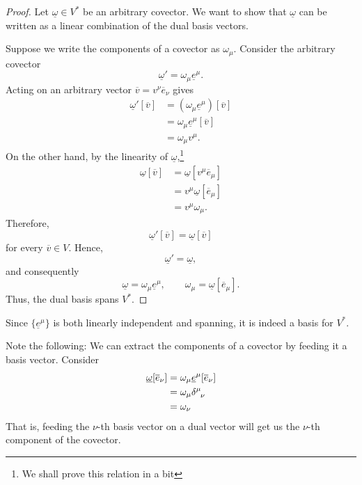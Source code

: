 		\begin{proof}
			Let $\underline{\omega}\in V^*$ be an arbitrary covector. We want to
			show that $\underline{\omega}$ can be written as a linear combination of
			the dual basis vectors.

			Suppose we write the components of a covector as $\omega_\mu$. Consider the arbitrary 
			covector
			\[
				\underline{\omega}'
				=
				\omega_\mu\underline{e}^\mu.
			\]
			Acting on an arbitrary vector $\overline{v}=v^\nu\overline{e}_\nu$ gives
			\begin{align}
				\underline{\omega}'[\overline{v}]
				&=
				\left(
					\omega_\mu\underline{e}^\mu
				\right)
				[\overline{v}]
				\nonumber\\
				&=
				\omega_\mu
				\underline{e}^\mu[\overline{v}]
				\nonumber\\
				&=
				\omega_\mu v^\mu.
			\end{align}
			On the other hand, by the linearity of $\underline{\omega}$,\footnote{We shall prove this relation in a bit}
			\begin{align}
				\underline{\omega}[\overline{v}]
				&=
				\underline{\omega}
				\left[
					v^\mu\overline{e}_\mu
				\right]
				\nonumber\\
				&=
				v^\mu
				\underline{\omega}[\overline{e}_\mu]
				\nonumber\\
				&=
				v^\mu\omega_\mu.
			\end{align}
			Therefore,
			\[
				\underline{\omega}'[\overline{v}]
				=
				\underline{\omega}[\overline{v}]
			\]
			for every $\overline{v}\in V$. Hence,
			\[
				\underline{\omega}'
				=
				\underline{\omega},
			\]
			and consequently
			\begin{equation}
				\label{eq:covector-expansion}
				\underline{\omega}
				=
				\omega_\mu\underline{e}^\mu,
				\qquad
				\omega_\mu
				=
				\underline{\omega}[\overline{e}_\mu].
			\end{equation}
			Thus, the dual basis spans $V^*$.
		\end{proof}

		Since $\{\underline{e}^\mu\}$ is both linearly independent and spanning,
		it is indeed a basis for $V^*$. 

		Note the following: We can extract the components of a covector by feeding it 
		a basis vector. Consider
		\begin{align*}
			\underline{\omega}
			[\overline{e}_\nu]
			&=
			\omega_\mu \underline{e}^\mu
			[\overline{e}_\nu] \\
			&= \omega_\mu \tensor{\delta}{^\mu_\nu}\\
			&= \omega_\nu
		\end{align*}
		That is, feeding the $\nu$-th basis vector on a dual vector will get us the 
		$\nu$-th component of the covector.

